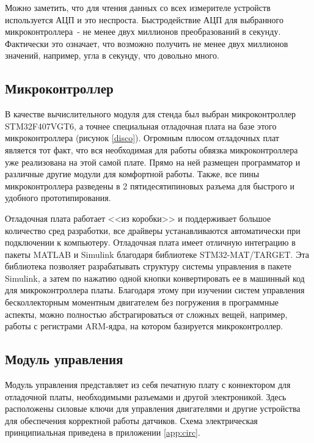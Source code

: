 Можно заметить, что для чтения данных со всех измерителе устройств используется АЦП и это неспроста. 
Быстродействие АЦП для выбранного микроконтроллера~- не менее двух миллионов преобразований в секунду.
Фактически это означает, что возможно получить не менее двух миллионов значений, например, 
угла в секунду, что довольно много.

\subsection{Микроконтроллер}

В качестве вычислительного модуля для стенда был выбран микроконтроллер STM32F407VGT6, 
а точнее специальная
отладочная плата на базе этого микроконтроллера (рисунок \ref{disco}). Огромным плюсом 
отладочных плат является тот факт, что
вся необходимая для работы обвязка микроконтроллера уже реализована на этой самой плате.
Прямо на ней размещен программатор и различные другие модули для комфортной работы.
Также, все пины микроконтроллера разведены в 2 пятидесятипиновых разъема для быстрого и удобного 
прототипирования.


Отладочная плата работает <<из коробки>> и поддерживает большое количество сред разработки,
все драйверы устанавливаются автоматически при подключении к компьютеру. Отладочная
плата имеет отличную интеграцию в пакеты MATLAB и Simulink благодаря библиотеке STM32-MAT/TARGET.
Эта библиотека позволяет разрабатывать структуру системы управления в пакете Simulink, а затем 
по нажатию одной кнопки конвертировать ее в машинный код для микроконтроллера платы.
Благодаря этому при изучении систем управления бесколлекторным моментным двигателем без
погружения в программные аспекты,
можно полностью абстрагироваться от сложных вещей, например, работы с регистрами ARM-ядра,
на котором базируется микроконтроллер.

\subsection{Модуль управления}

Модуль управления представляет из себя печатную плату с коннектором для отладочной платы, необходимыми 
разъемами и другой электроникой. Здесь расположены силовые ключи для управления 
двигателями и другие устройства для обеспечения корректной работы датчиков.
Схема электрическая принципиальная приведена в приложении \ref{app:circ}.

